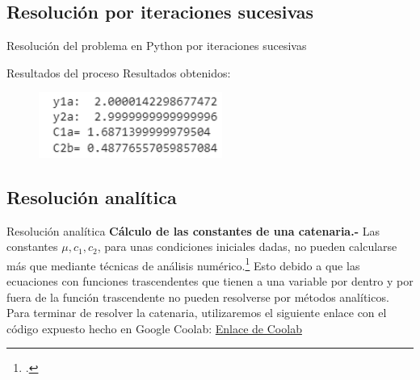 \subsection[R. iteraciones]{Resolución por iteraciones sucesivas}
\begin{frame}{Resolución del problema en Python por iteraciones sucesivas}

       
\end{frame}
\begin{frame}{Resultados del proceso}
            Resultados obtenidos:
            \begin{figure}[h]
                \includegraphics[width=6cm]{Imagenes/Resultados1.png}
                \centering
            \end{figure}
\end{frame}
  
\subsection[R. analitica]{Resolución analítica}
\begin{frame}{Resolución analítica}
    \textbf{Cálculo de las constantes de una catenaria.-}  Las constantes $\mu, c_{1}, c_{2}$, para unas condiciones iniciales dadas, no pueden calcularse más que mediante técnicas de análisis numérico.\footcite{Car12}
    Esto debido a que las ecuaciones con funciones trascendentes que tienen a una variable por dentro y por fuera de la función trascendente no pueden resolverse por métodos analíticos. \\Para terminar de resolver la catenaria, utilizaremos el siguiente enlace con el código expuesto hecho en Google Coolab: \href{https://colab.research.google.com/drive/1zJW8x3nobNhw7CngeY5IqShL2OD_w9AH?hl=es#scrollTo=KHneYamBqSlN}{Enlace de Coolab}
    
    
\end{frame}



